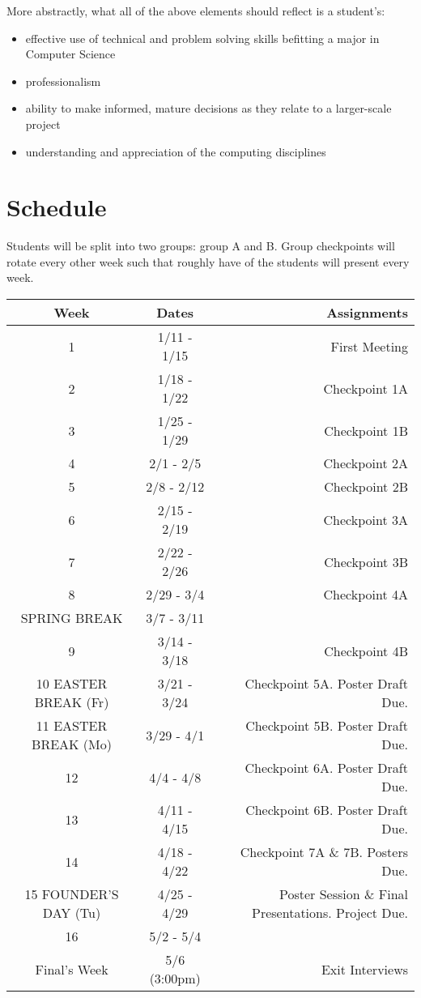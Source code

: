 \documentclass[10pt]{article}
\begin{document}
More abstractly, what all of the above elements should reflect is a student's: 
\begin{itemize}
\item effective use of technical and problem solving skills befitting a major in Computer Science
\item professionalism
\item ability to make informed, mature decisions as they relate to a larger-scale project
\item understanding and appreciation of the computing disciplines
\end{itemize}

\section{Schedule}

Students will be split into two groups: group A and B. Group checkpoints will rotate every other week such that roughly have of the students will present every week. 

\begin{center}
\begin{tabular}{|c|c|r|}
\hline 
Week & Dates & Assignments \\
\hline
1 & 1/11 - 1/15 &  First Meeting\\
\hline
2 & 1/18 - 1/22 & Checkpoint 1A \\
\hline
3 & 1/25 - 1/29 & Checkpoint 1B  \\
\hline
4 & 2/1 - 2/5 & Checkpoint 2A  \\
\hline
5 & 2/8 - 2/12 & Checkpoint 2B  \\
\hline
6 & 2/15 - 2/19 & Checkpoint 3A \\
\hline
7 & 2/22 - 2/26 & Checkpoint 3B  \\
\hline
8 & 2/29 - 3/4 &  Checkpoint 4A  \\
\hline 
SPRING BREAK & 3/7 - 3/11 &  \\
\hline
9 & 3/14 - 3/18 & Checkpoint 4B \\
\hline
10 EASTER BREAK (Fr)& 3/21 - 3/24 & Checkpoint 5A. Poster Draft Due.\\
\hline
11 EASTER BREAK (Mo)& 3/29 - 4/1 &  Checkpoint 5B. Poster Draft Due. \\
\hline
12 & 4/4 - 4/8 & Checkpoint 6A. Poster Draft Due. \\
\hline
13 & 4/11 - 4/15 &  Checkpoint 6B. Poster Draft Due.  \\
\hline
14 & 4/18 - 4/22 &  Checkpoint 7A \& 7B. Posters Due. \\
\hline
15 FOUNDER'S DAY (Tu) & 4/25 - 4/29 & Poster Session \& Final Presentations. Project Due.\\ 
\hline
16 & 5/2 - 5/4 & \\
\hline
Final's Week & 5/6 (3:00pm) & Exit Interviews \\ 
\hline
\end{tabular}
\end{center}
\end{document}
